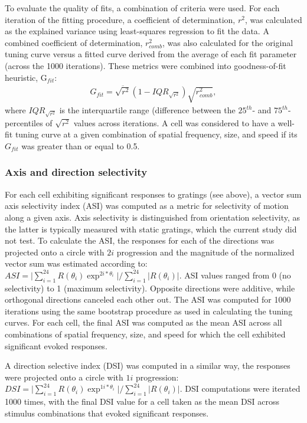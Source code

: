 To evaluate the quality of fits, a combination of criteria were used\cite{Liang2018}. For each iteration of the fitting procedure, a coefficient of determination, $r^2$, was calculated as the explained variance using least-squares regression to fit the data\cite{More1978, Virtanen2020}. A combined coefficient of determination, $r_{comb}^2$, was also calculated for the original tuning curve versus a fitted curve derived from the average of each fit parameter (across the 1000 iterations). These metrics were combined into goodness-of-fit heuristic, G$_{fit}$: 
\begin{align}
G_{fit}=\overline{\sqrt{r^2}} (1-IQR_{\sqrt{r^2}}) \sqrt{r_{comb}^2}, 
\end{align}
where $IQR_{\sqrt{r^2}}$ is the interquartile range (difference between the $25^{th}$- and $75^{th}$-percentiles of $\sqrt{r^2}$ values across iterations. A cell was considered to have a well-fit tuning curve at a given combination of spatial frequency, size, and speed if its $G_{fit}$ was greater than or equal to 0.5. 

\subsubsection{Axis and direction selectivity}
For each cell exhibiting significant responses to gratings (see above), a vector sum axis selectivity index (ASI) was computed as a metric for selectivity of motion along a given axis\cite{Liang2018, Kerlin2010}. Axis selectivity is distinguished from orientation selectivity, as the latter is typically measured with static gratings, which the current study did not test. To calculate the ASI, the responses for each of the directions was projected onto a circle with $2i$ progression and the magnitude of the normalized vector sum was estimated according to:  $ASI=\big|\sum_{i=1}^{24} R(\theta_i) \exp^{2i*\theta_i}\big|/\sum_{i=1}^{24}|R(\theta_i)|$. ASI values ranged from 0 (no selectivity) to 1 (maximum selectivity). Opposite directions were additive, while orthogonal directions canceled each other out. The ASI was computed for 1000 iterations using the same bootstrap procedure as used in calculating the tuning curves. For each cell, the final ASI was computed as the mean ASI across all combinations of spatial frequency, size, and speed for which the cell exhibited significant evoked responses. 

A direction selective index (DSI) was computed in a similar way, the responses were projected onto a circle with $1i$ progression:  $DSI=\big|\sum_{i=1}^{24} R(\theta_i) \exp^{1i*\theta_i}\big|/\sum_{i=1}^{24}|R(\theta_i)|$. DSI computations were iterated 1000 times, with the final DSI value for a cell taken as the mean DSI across stimulus combinations that evoked significant responses. 

